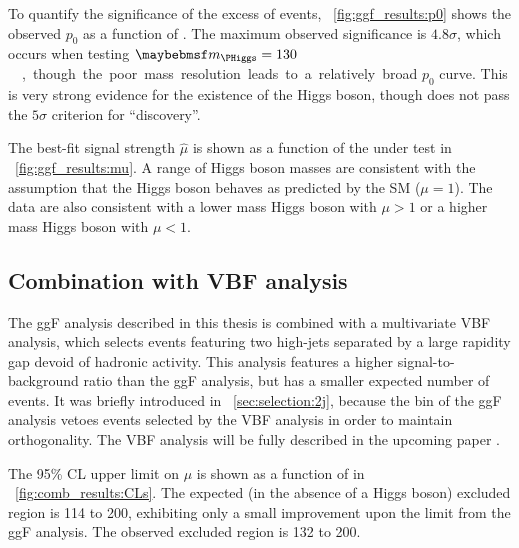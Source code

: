 To quantify the significance of the excess of events, \Figure~\ref{fig:ggf_results:p0} shows 
the observed $p_0$ as a function of \mH. The maximum observed significance is $4.8\sigma$, 
which occurs when testing \unit{$\mH = 130$}{\GeV}, though the poor mass resolution leads to 
a relatively broad $p_0$ curve. This is very strong evidence for the existence of the Higgs 
boson, though does not pass the $5\sigma$ criterion for ``discovery''.

The best-fit signal strength $\hat{\mu}$ is shown as a function of the \mH under test in 
\Figure~\ref{fig:ggf_results:mu}. A range of Higgs boson masses are consistent with the 
assumption that the Higgs boson behaves as predicted by the SM (\ie $\mu = 1$). The data 
are also consistent with a lower mass Higgs boson with $\mu > 1$ or a higher mass Higgs 
boson with $\mu < 1$. 



\subsection{Combination with VBF analysis}
\label{sec:results:combined_limits}

The ggF analysis described in this thesis is combined with a multivariate VBF analysis, 
which selects events featuring two high-\pt jets separated by a large rapidity gap devoid of 
hadronic activity. This analysis features a higher signal-to-background ratio than the ggF 
analysis, but has a smaller expected number of events. It was briefly introduced in 
\Section~\ref{sec:selection:2j}, because the \twojet bin of the ggF analysis vetoes events 
selected by the VBF analysis in order to maintain orthogonality. The VBF analysis will be 
fully described in the upcoming paper \cite{HWW-RunI}.

The 95\% CL upper limit on $\mu$ is shown as a function of \mH in 
\Figure~\ref{fig:comb_results:CLs}. The expected (in the absence of a Higgs boson) excluded 
region is \unit{114}{\GeV} to \unit{200}{\GeV}, exhibiting only a small improvement upon the 
limit from the ggF analysis. The observed excluded region is \unit{132}{\GeV} to 
\unit{200}{\GeV}.

